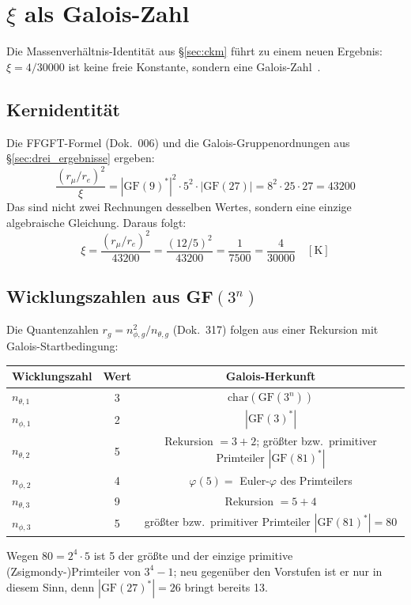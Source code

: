 \section{$\xi$ als Galois-Zahl}
\label{sec:xi_galois}

Die Massenverhältnis-Identität aus §\ref{sec:ckm} führt zu einem
neuen Ergebnis: $\xi = 4/30000$ ist keine freie Konstante, sondern
eine Galois-Zahl~\KM.

\subsection{Kernidentität}

Die FFGFT-Formel (Dok.~006) und die Galois-Gruppenordnungen
aus §\ref{sec:drei_ergebnisse} ergeben:
\begin{equation}
  \frac{(r_\mu/r_e)^2}{\xi}
  = |\text{GF}(9)^*|^2 \cdot 5^2 \cdot |\text{GF}(27)|
  = 8^2 \cdot 25 \cdot 27
  = 43200
\end{equation}
Das sind nicht zwei Rechnungen desselben Wertes, sondern eine
einzige algebraische Gleichung. Daraus folgt:
\begin{equation}
  \xi = \frac{(r_\mu/r_e)^2}{43200}
  = \frac{(12/5)^2}{43200}
  = \frac{1}{7500} = \frac{4}{30000}
  \quad [\text{K}]
\end{equation}

\subsection{Wicklungszahlen aus GF$(3^n)$}

Die Quantenzahlen $r_g = n_{\phi,g}^2/n_{\theta,g}$ (Dok.~317) folgen
aus einer Rekursion mit Galois-Startbedingung:

\begin{center}
\begin{tabular}{lcc}
\toprule
Wicklungszahl & Wert & Galois-Herkunft \\
\midrule
$n_{\theta,1}$ & 3 & $\text{char}(\text{GF}(3^n))$ \\
$n_{\phi,1}$   & 2 & $|\text{GF}(3)^*|$ \\
$n_{\theta,2}$ & 5 & Rekursion $= 3+2$; größter bzw.\ primitiver Primteiler $|\text{GF}(81)^*|$ \\
$n_{\phi,2}$   & 4 & $\varphi(5) = $ Euler-$\varphi$ des Primteilers \\
$n_{\theta,3}$ & 9 & Rekursion $= 5+4$ \\
$n_{\phi,3}$   & 5 & größter bzw.\ primitiver Primteiler $|\text{GF}(81)^*| = 80$ \\
\bottomrule
\end{tabular}
\end{center}
Wegen $80 = 2^4\cdot 5$ ist 5 der größte und der einzige primitive
(Zsigmondy-)Primteiler von $3^4-1$; neu gegenüber den Vorstufen ist er nur
in diesem Sinn, denn $|\text{GF}(27)^*| = 26$ bringt bereits 13.

